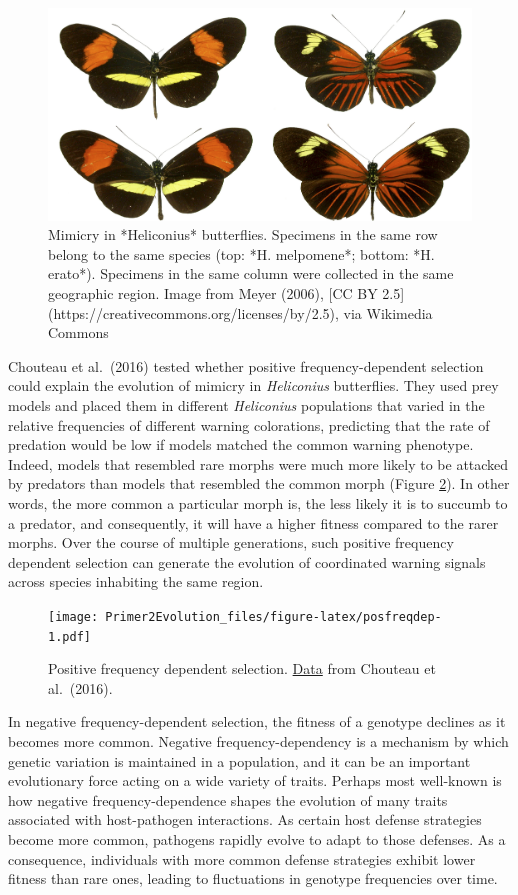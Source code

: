 \documentclass[
]{book}
\begin{document}
\begin{figure}
\includegraphics[width=1\linewidth]{images/Heliconius_mimicry} \caption{Mimicry in *Heliconius* butterflies. Specimens in the same row belong to the same species (top: *H. melpomene*; bottom: *H. erato*). Specimens in the same column were collected in the same geographic region. Image from Meyer (2006), [CC BY 2.5](https://creativecommons.org/licenses/by/2.5), via Wikimedia Commons}\label{fig:heliconius}
\end{figure}

Chouteau et al.~(2016) tested whether positive frequency-dependent selection could explain the evolution of mimicry in \emph{Heliconius} butterflies. They used prey models and placed them in different \emph{Heliconius} populations that varied in the relative frequencies of different warning colorations, predicting that the rate of predation would be low if models matched the common warning phenotype. Indeed, models that resembled rare morphs were much more likely to be attacked by predators than models that resembled the common morph (Figure \ref{fig:posfreqdep}). In other words, the more common a particular morph is, the less likely it is to succumb to a predator, and consequently, it will have a higher fitness compared to the rarer morphs. Over the course of multiple generations, such positive frequency dependent selection can generate the evolution of coordinated warning signals across species inhabiting the same region.

\begin{figure}
\centering
\texttt{[image: Primer2Evolution\_files/figure-latex/posfreqdep-1.pdf]}
\caption{\label{fig:posfreqdep}Positive frequency dependent selection. \href{data/5_positivefreqdep.csv}{Data} from Chouteau et al.~(2016).}
\end{figure}

In negative frequency-dependent selection, the fitness of a genotype declines as it becomes more common. Negative frequency-dependency is a mechanism by which genetic variation is maintained in a population, and it can be an important evolutionary force acting on a wide variety of traits. Perhaps most well-known is how negative frequency-dependence shapes the evolution of many traits associated with host-pathogen interactions. As certain host defense strategies become more common, pathogens rapidly evolve to adapt to those defenses. As a consequence, individuals with more common defense strategies exhibit lower fitness than rare ones, leading to fluctuations in genotype frequencies over time.
\end{document}
